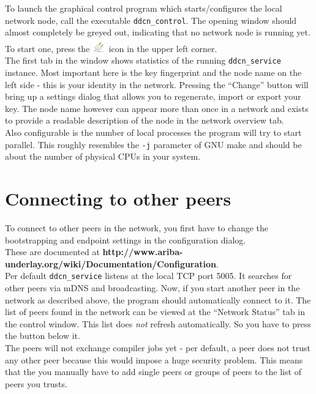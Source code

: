 \documentclass[a4paper,9pt]{scrartcl}
\begin{document}
To launch the graphical control program which starts/configures the local network node, call the executable \texttt{ddcn\_control}. The opening window should almost completely be greyed out, indicating that no network node is running yet. To start one, press the 
\includegraphics[scale=0.1,keepaspectratio=true]{../ddcn_control/icons/network-disconnect.png} icon in the upper left corner.\\
\smallskip
The first tab in the window shows statistics of the running \texttt{ddcn\_service} instance. Most important here is the key fingerprint and the node name on the left side - this is your identity in the network. Pressing the ``Change'' button will bring up a settings dialog that allows you to regenerate, import or export your key. The node name however can appear more than once in a network and exists to provide a readable description of the node in the network overview tab.\\
\smallskip
Also configurable is the number of local processes the program will try to start parallel. This roughly resembles the \texttt{-j} parameter of GNU make and should be about the number of physical CPUs in your system.

\section{Connecting to other peers}

To connect to other peers in the network, you first have to change the bootstrapping and endpoint settings in the configuration dialog.\\These are documented at \textbf{http://www.ariba-underlay.org/wiki/Documentation/Configuration}.\\Per default \texttt{ddcn\_service} listens at the local TCP port 5005. It searches for other peers via mDNS and broadcasting. Now, if you start another peer in the network as described above, the program should automatically connect to it. The list of peers found in the network can be viewed at the ``Network Status'' tab in the control window. This list does \textit{not} refresh automatically. So you have to press the button below it.\\
The peers will not exchange compiler jobs yet - per default, a peer does not trust any other peer because this would impose a huge security problem. This means that the you manually have to add single peers or groups of peers to the list of peers you trusts.
\end{document}
